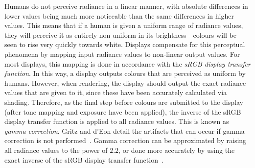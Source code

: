 Humans do not perceive radiance in a linear manner, with absolute differences in lower values being much more noticeable than the same differences in higher values. This means that if a human is given a uniform range of radiance values, they will perceive it as entirely non-uniform in its brightness - colours will be seen to rise very quickly towards white. Displays compensate for this perceptual phenomena by mapping input radiance values to non-linear output values. For most displays, this mapping is done in accordance with the \textit{sRGB display transfer function}. In this way, a display outputs colours that are perceived as uniform by humans. However, when rendering, the display should output the exact radiance values that are given to it, since these have been accurately calculated via shading. Therefore, as the final step before colours are submitted to the display (after tone mapping and exposure have been applied), the inverse of the sRGB display transfer function is applied to all radiance values. This is known as \textit{gamma correction}. Gritz and d'Eon detail the artifacts that can occur if gamma correction is not performed~\cite{GPUGemsChapter24}. Gamma correction can be approximated by raising all radiance values to the power of \begin{math}2.2\end{math}, or done more accurately by using the exact inverse of the sRGB display transfer function~\cite{MovingFrostbitetoPBR}.